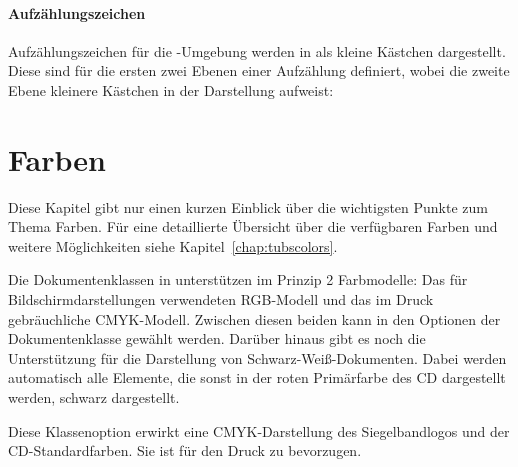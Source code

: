 \paragraph{Aufzählungszeichen}

Aufzählungszeichen für die -Umgebung werden in \tubslatex
als kleine Kästchen dargestellt.
Diese sind für die ersten zwei Ebenen einer Aufzählung definiert, wobei
die zweite Ebene kleinere Kästchen in der Darstellung aufweist:
\begin{center}
\end{center}



\section{Farben}

Diese Kapitel gibt nur einen kurzen Einblick über die wichtigsten Punkte
zum Thema Farben. Für eine detaillierte Übersicht über die verfügbaren Farben
und weitere Möglichkeiten siehe Kapitel~\ref{chap:tubscolors}.%

Die Dokumentenklassen in \tubslatex unterstützen im Prinzip 2 Farbmodelle:
Das für Bildschirmdarstellungen verwendeten RGB-Modell und das im
Druck gebräuchliche CMYK-Modell. Zwischen diesen beiden kann in den Optionen
der Dokumentenklasse gewählt werden. Darüber hinaus gibt es noch die Unterstützung
für die Darstellung von Schwarz-Weiß-Dokumenten. Dabei werden automatisch
alle Elemente, die sonst in der roten Primärfarbe des CD dargestellt werden,
schwarz dargestellt.

\begin{Declaration}
\end{Declaration}

Diese Klassenoption erwirkt eine CMYK-Darstellung des Siegelbandlogos und der
CD-Standardfarben. Sie ist für den Druck zu bevorzugen.

